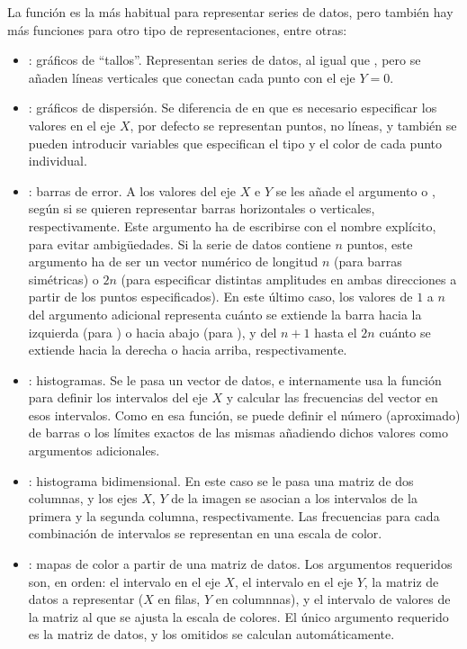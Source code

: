La función  es la más habitual para representar series de datos, pero también hay más funciones para otro tipo de representaciones, entre otras:

\begin{itemize}
  \item {}: gráficos de ``tallos''. Representan series de datos, al igual que , pero se añaden líneas verticales que conectan cada punto con el eje $Y=0$.
  \item {}: gráficos de dispersión. Se diferencia de  en que es necesario especificar los valores en el eje $X$, por defecto se representan puntos, no líneas, y también se pueden introducir variables que especifican el tipo y el color de cada punto individual.
  \item {}: barras de error. A los valores del eje $X$ e $Y$ se les añade el argumento  o , según si se quieren representar barras horizontales o verticales, respectivamente. Este argumento ha de escribirse con el nombre explícito, para evitar ambigüedades. Si la serie de datos contiene $n$ puntos, este argumento ha de ser un vector numérico de longitud $n$ (para barras simétricas) o $2n$ (para especificar distintas amplitudes en ambas direcciones a partir de los puntos especificados). En este último caso, los valores de $1$ a $n$ del argumento adicional representa cuánto se extiende la barra hacia la izquierda (para ) o hacia abajo (para ), y del $n+1$ hasta el $2n$ cuánto se extiende hacia la derecha o hacia arriba, respectivamente.
  \item {}: histogramas. Se le pasa un vector de datos, e internamente usa la función  para definir los intervalos del eje $X$ y calcular las frecuencias del vector en esos intervalos. Como en esa función, se puede definir el número (aproximado) de barras o los límites exactos de las mismas añadiendo dichos valores como argumentos adicionales.
  \item{}: histograma bidimensional. En este caso se le pasa una matriz de dos columnas, y los ejes $X$, $Y$ de la imagen se asocian a los intervalos de la primera y la segunda columna, respectivamente. Las frecuencias para cada combinación de intervalos se representan en una escala de color.
  \item{}: mapas de color a partir de una matriz de datos. Los argumentos requeridos son, en orden: el intervalo en el eje $X$, el intervalo en el eje $Y$, la matriz de datos a representar ($X$ en filas, $Y$ en columnnas), y el intervalo de valores de la matriz al que se ajusta la escala de colores. El único argumento requerido es la matriz de datos, y los omitidos se calculan automáticamente.
\end{itemize}


